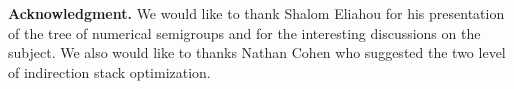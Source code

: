 \documentclass[reqno,11pt]{amsart}
\theoremstyle{plain}
\theoremstyle{definition}
\begin{document}
% 
% 

\textbf{Acknowledgment.} We would like to thank Shalom Eliahou for his
presentation of the tree of numerical semigroups and for the interesting
discussions on the subject. We also would like to thanks Nathan Cohen who
suggested the two level of indirection stack optimization.
\end{document}
